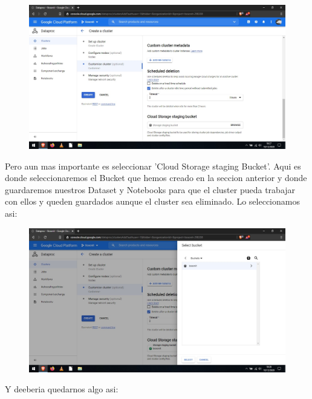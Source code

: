 \documentclass[a4paper,10pt]{article}
\begin{document}
\begin{figure}[H]
\begin{center}
\includegraphics[width=500pt]{./fotos/GoogleCloud/31 - GC.jpg}
\end{center}
\end{figure} 

Pero aun mas importante es seleccionar 'Cloud Storage staging Bucket'. Aqui es donde seleccionaremos el Bucket que hemos creado en la seccion anterior y donde guardaremos nuestros Dataset y Notebooks para que el cluster pueda trabajar con ellos y queden guardados aunque el cluster sea eliminado. Lo seleccionamos asi:

\begin{figure}[H]
\begin{center}
\includegraphics[width=500pt]{./fotos/GoogleCloud/32 - GC.jpg}
\end{center}
\end{figure}

Y deeberia quedarnos algo asi:
\end{document}
